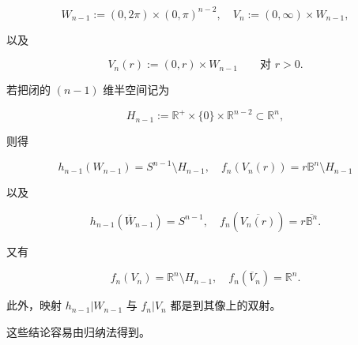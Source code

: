 \begin{equation}
W_{n-1} := (0, 2\pi)\times(0, \pi)^{n-2}, \quad V_{n} := (0, \infty)\times W_{n-1},\tag{8.19}
\end{equation}

以及

\begin{equation}
V_{n}(r) := (0, r)\times W_{n-1} \qquad \text{对 } r > 0.\tag{8.20}
\end{equation}

若把闭的 $ (n-1) $ 维半空间记为

\begin{equation}
H_{n-1} := \mathbb{R}^{+}\times\{0\}\times\mathbb{R}^{n-2} \subset \mathbb{R}^{n},\tag{8.21}
\end{equation}

则得

\begin{equation}
h_{n-1}(W_{n-1}) = S^{n-1}\setminus H_{n-1}, \quad f_{n}(V_{n}(r)) = r\mathbb{B}^{n}\setminus H_{n-1}\tag{8.22}
\end{equation}

以及

\begin{equation}
h_{n-1}(\overline{W}_{n-1}) = S^{n-1}, \quad f_{n}(\overline{V_{n}(r)}) = r\overline{\mathbb{B}^{n}}.\tag{8.23}
\end{equation}

又有

\begin{equation}
f_{n}(V_{n}) = \mathbb{R}^{n}\setminus H_{n-1}, \quad f_{n}(\overline{V}_{n}) = \mathbb{R}^{n}.\tag{8.24}
\end{equation}

此外，映射 $ h_{n-1}|W_{n-1} $ 与 $ f_{n}|V_{n} $ 都是到其像上的双射。


这些结论容易由归纳法得到。

